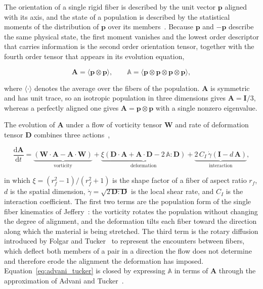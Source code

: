 \documentclass[%
  aip,
  pof,          %
  reprint,      %
  floatfix
]{revtex4-2}
\begin{document}
The orientation of a single rigid fiber is described by the unit vector $\bm{p}$ aligned with its axis, and the state of a population is described by the statistical moments of the distribution of $\bm{p}$ over its members~\cite{advani1987use,doi1986theory}. Because $\bm{p}$ and $-\bm{p}$ describe the same physical state, the first moment vanishes and the lowest order descriptor that carries information is the second order orientation tensor, together with the fourth order tensor that appears in its evolution equation,

\begin{equation}
    \bm{A} = \langle \bm{p} \otimes \bm{p} \rangle, \qquad \mathbb{A} = \langle \bm{p} \otimes \bm{p} \otimes \bm{p} \otimes \bm{p} \rangle,
    \label{eq:orientation_tensors}
\end{equation}

where $\langle \cdot \rangle$ denotes the average over the fibers of the population. $\bm{A}$ is symmetric and has unit trace, so an isotropic population in three dimensions gives $\bm{A} = \bm{I}/3$, whereas a perfectly aligned one gives $\bm{A} = \bm{p}\otimes\bm{p}$ with a single nonzero eigenvalue.

The evolution of $\bm{A}$ under a flow of vorticity tensor $\bm{W}$ and rate of deformation tensor $\bm{D}$ combines three actions~\cite{advani1987use,folgar1984orientation},

\begin{equation}
    \frac{\mathrm{d}\bm{A}}{\mathrm{d}t}
    = \underbrace{\left(\bm{W}\!\cdot\!\bm{A} - \bm{A}\!\cdot\!\bm{W}\right)}_{\text{vorticity}}
    + \underbrace{\xi\left(\bm{D}\!\cdot\!\bm{A} + \bm{A}\!\cdot\!\bm{D} - 2\,\mathbb{A}\!:\!\bm{D}\right)}_{\text{deformation}}
    + \underbrace{2\,C_I\,\dot{\gamma}\left(\bm{I} - d\,\bm{A}\right)}_{\text{interaction}},
    \label{eq:advani_tucker}
\end{equation}

in which $\xi = (r_f^2-1)/(r_f^2+1)$ is the shape factor of a fiber of aspect ratio $r_f$, $d$ is the spatial dimension, $\dot{\gamma} = \sqrt{2\,\bm{D}\!:\!\bm{D}}$ is the local shear rate, and $C_I$ is the interaction coefficient. The first two terms are the population form of the single fiber kinematics of Jeffery~\cite{jeffery1922motion}: the vorticity rotates the population without changing the degree of alignment, and the deformation tilts each fiber toward the direction along which the material is being stretched. The third term is the rotary diffusion introduced by Folgar and Tucker~\cite{folgar1984orientation} to represent the encounters between fibers, which deflect both members of a pair in a direction the flow does not determine and therefore erode the alignment the deformation has imposed. Equation~\eqref{eq:advani_tucker} is closed by expressing $\mathbb{A}$ in terms of $\bm{A}$ through the approximation of Advani and Tucker~\cite{advani1987use,cintra1995orthotropic}.
\end{document}
